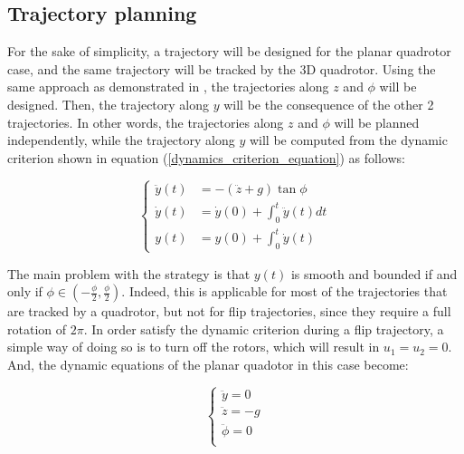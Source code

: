 \documentclass{thesisreport}
\begin{document}
\subsection{Trajectory planning}


For the sake of simplicity, a trajectory will be designed for the planar quadrotor case, and the same trajectory will be tracked by the 3D quadrotor. 
Using the same approach as demonstrated in \cite{Orsingher2019}, the trajectories along $z$ and $\phi$ will be designed. Then, the trajectory along $y$ will be the consequence of the other 2 trajectories. In other words, the trajectories along $z$ and $\phi$ will be planned independently, while the trajectory along $y$ will be computed from the dynamic criterion shown in equation (\ref{dynamics_criterion_equation}) as follows: 

\begin{equation}\label{double_integration_of_ydd}
\begin{cases}
	\ddot{y}(t) &= - (\ddot{z} + g) \tan \phi \\
	\dot{y}(t)  &= \dot{y}(0) + \int_0^t \ddot{y}(t) dt \\
	y(t) &= y(0) + \int_0^t \dot{y}(t) 
\end{cases}
\end{equation}

\newpage

The main problem with the strategy is that $y(t)$ is smooth and bounded if and only if $\phi \in (-\frac{\phi}{2}, \frac{\phi}{2})$. Indeed, this is applicable for most of the trajectories that are tracked by a quadrotor, but not for flip trajectories, since they require a full rotation of $2 \pi$. In order satisfy the dynamic criterion during a flip trajectory, a simple way of doing so is to turn off the rotors, which will result in $u_1=u_2=0$. And, the dynamic equations of the planar quadotor in this case become:

\begin{equation}\label{free_dynamics_planar_quadrotor}
 \begin{cases} 
       \ddot{y} = 0 \\
       \ddot{z} = - g  \\
       \ddot{\phi} = 0 \\
   \end{cases}
\end{equation}
\end{document}
